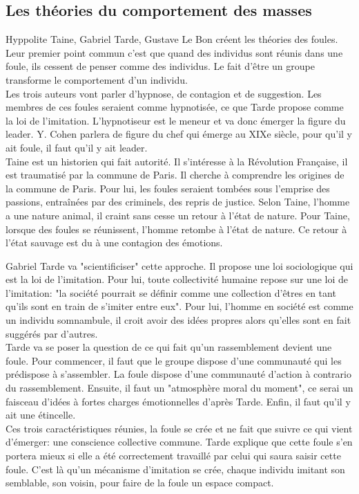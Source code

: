\documentclass[10pt, a4paper, openany]{book}
\begin{document}
\subsection{Les théories du comportement des masses}

Hyppolite Taine, Gabriel Tarde, Gustave Le Bon créent les théories des foules. Leur premier point commun c'est que quand des individus sont réunis dans une foule, ils cessent de penser comme des individus. Le fait d'être un groupe transforme le comportement d'un individu. \\
Les trois auteurs vont parler d'hypnose, de contagion et de suggestion. Les membres de ces foules seraient comme hypnotisée, ce que Tarde propose comme la loi de l'imitation. L'hypnotiseur est le meneur et va donc émerger la figure du leader. Y. Cohen parlera de figure du chef qui émerge au XIXe siècle, pour qu'il y ait foule, il faut qu'il y ait leader. \\
Taine est un historien qui fait autorité. Il s'intéresse à la Révolution Française, il est traumatisé par la commune de Paris. Il cherche à comprendre les origines de la commune de Paris. Pour lui, les foules seraient tombées sous l'emprise des passions, entraînées par des criminels, des repris de justice. Selon Taine, l'homme a une nature animal, il craint sans cesse un retour à l'état de nature. Pour Taine, lorsque des foules se réunissent, l'homme retombe à l'état de nature. Ce retour à l'état sauvage est du à une contagion des émotions. 


Gabriel Tarde va "scientificiser" cette approche. Il propose une loi sociologique qui est la loi de l'imitation. Pour lui, toute collectivité humaine repose sur une loi de l'imitation: "la société pourrait se définir comme une collection d'êtres en tant qu'ils sont en train de s'imiter entre eux". Pour lui, l'homme en société est comme un individu somnambule, il croit avoir des idées propres alors qu'elles sont en fait suggérés par d'autres. \\
Tarde va se poser la question de ce qui fait qu'un rassemblement devient une foule. Pour commencer, il faut que le groupe dispose d'une communauté qui les prédispose à s'assembler. La foule dispose d'une communauté d'action à contrario du rassemblement. Ensuite, il faut un "atmosphère moral du moment", ce serai un faisceau d'idées à fortes charges émotionnelles d'après Tarde. Enfin, il faut qu'il y ait une étincelle. \\
Ces trois caractéristiques réunies, la foule se crée et ne fait que suivre ce qui vient d'émerger: une conscience collective commune. Tarde explique que cette foule s'en portera mieux si elle a été correctement travaillé par celui qui saura saisir cette foule. C'est là qu'un mécanisme d'imitation se crée, chaque individu imitant son semblable, son voisin, pour faire de la foule un espace compact. 
\end{document}

